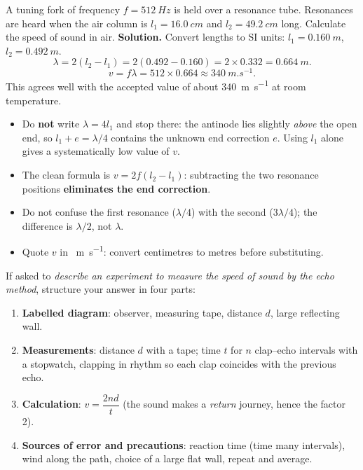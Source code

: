\documentclass[11pt]{article}
\begin{document}
\begin{exoresolu}
A tuning fork of frequency $f = \SI{512}{Hz}$ is held over a resonance tube. Resonances are heard when the air column is $l_1 = \SI{16.0}{cm}$ and $l_2 = \SI{49.2}{cm}$ long. Calculate the speed of sound in air.
\tcblower
\textbf{Solution.} Convert lengths to SI units: $l_1 = \SI{0.160}{m}$, $l_2 = \SI{0.492}{m}$.
\[ \lambda = 2(l_2 - l_1) = 2(0.492 - 0.160) = 2 \times 0.332 = \SI{0.664}{m}. \]
\[ v = f\lambda = 512 \times 0.664 \approx \SI{340}{m.s^{-1}}. \]
This agrees well with the accepted value of about \SI{340}{m.s^{-1}} at room temperature.
\end{exoresolu}

\begin{attention}
\begin{itemize}
\item Do \textbf{not} write $\lambda = 4l_1$ and stop there: the antinode lies slightly \emph{above} the open end, so $l_1 + e = \lambda/4$ contains the unknown end correction $e$. Using $l_1$ alone gives a systematically low value of $v$.
\item The clean formula is $v = 2f(l_2 - l_1)$: subtracting the two resonance positions \textbf{eliminates the end correction}.
\item Do not confuse the first resonance ($\lambda/4$) with the second ($3\lambda/4$); the difference is $\lambda/2$, not $\lambda$.
\item Quote $v$ in \SI{}{m.s^{-1}}: convert centimetres to metres before substituting.
\end{itemize}
\end{attention}

\begin{methode}
If asked to \emph{describe an experiment to measure the speed of sound by the echo method}, structure your answer in four parts:
\begin{enumerate}
\item \textbf{Labelled diagram}: observer, measuring tape, distance $d$, large reflecting wall.
\item \textbf{Measurements}: distance $d$ with a tape; time $t$ for $n$ clap--echo intervals with a stopwatch, clapping in rhythm so each clap coincides with the previous echo.
\item \textbf{Calculation}: $v = \dfrac{2nd}{t}$ (the sound makes a \emph{return} journey, hence the factor 2).
\item \textbf{Sources of error and precautions}: reaction time (time many intervals), wind along the path, choice of a large flat wall, repeat and average.
\end{enumerate}
\end{methode}
\end{document}
